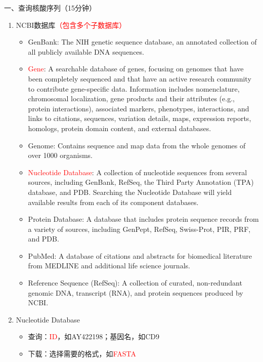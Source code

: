 \documentclass{TIJMUjiaoanSY}
\begin{document}


\firstTail


\newpage
\otherHeader

\noindent
一、查询核酸序列（15分钟）
\begin{enumerate}
  \item NCBI数据库\textcolor{red}{（包含多个子数据库）}
    \begin{itemize}
      \item GenBank: The NIH genetic sequence database, an annotated collection of all publicly available DNA sequences.
      \item \textcolor{red}{Gene}: A searchable database of genes, focusing on genomes that have been completely sequenced and that have an active research community to contribute gene-specific data. Information includes nomenclature, chromosomal localization, gene products and their attributes (e.g., protein interactions), associated markers, phenotypes, interactions, and links to citations, sequences, variation details, maps, expression reports, homologs, protein domain content, and external databases.
      \item Genome: Contains sequence and map data from the whole genomes of over 1000 organisms. 
      \item \textcolor{red}{Nucleotide Database}: A collection of nucleotide sequences from several sources, including GenBank, RefSeq, the Third Party Annotation (TPA) database, and PDB. Searching the Nucleotide Database will yield available results from each of its component databases.
      \item  Protein Database: A database that includes protein sequence records from a variety of sources, including GenPept, RefSeq, Swiss-Prot, PIR, PRF, and PDB.
      \item  PubMed: A database of citations and abstracts for biomedical literature from MEDLINE and additional life science journals. 
      \item  Reference Sequence (RefSeq): A collection of curated, non-redundant genomic DNA, transcript (RNA), and protein sequences produced by NCBI.
    \end{itemize}
  \item Nucleotide Database
    \begin{itemize}
      \item 查询：\textcolor{red}{ID}，如AY422198；基因名，如CD9
      \item 下载：选择需要的格式，如\textcolor{red}{FASTA}
    \end{itemize}
\end{enumerate}
\end{document}
